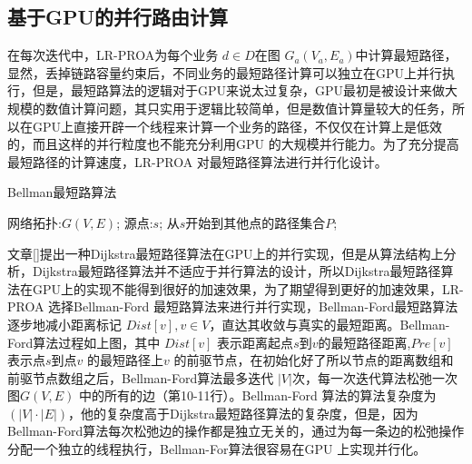 \subsection{基于GPU的并行路由计算}
  在每次迭代中，LR-PROA为每个业务 $d \in D$在图 $G_a(V_a, E_a)$中计算最短路径，显然，丢掉链路容量约束后，不同业务的最短路径计算可以独立在GPU上并行执行，但是，最短路算法的逻辑对于GPU来说太过复杂，GPU最初是被设计来做大规模的数值计算问题，其只实用于逻辑比较简单，但是数值计算量较大的任务，所以在GPU上直接开辟一个线程来计算一个业务的路径，不仅仅在计算上是低效的，而且这样的并行粒度也不能充分利用GPU 的大规模并行能力。为了充分提高最短路径的计算速度，LR-PROA 对最短路径算法进行并行化设计。
\begin{algorithm}[htb]
\caption{{Bellman最短路算法}}
\label{Bellman}
\begin{algorithmic}[1]
\Require
网络拓扑:$G(V, E)$;
源点:$s$;
\Ensure
从$s$开始到其他点的路径集合$P$;
\EndFor
{}
\EndIf
\EndFor
\EndWhile
{}
\end{algorithmic}
\end{algorithm}
  文章[]提出一种Dijkstra最短路径算法在GPU上的并行实现，但是从算法结构上分析，Dijkstra最短路径算法并不适应于并行算法的设计，所以Dijkstra最短路径算法在GPU上的实现不能得到很好的加速效果，为了期望得到更好的加速效果，LR-PROA 选择Bellman-Ford 最短路算法来进行并行实现，Bellman-Ford最短路算法逐步地减小距离标记 $Dist[v],v\in V$，直达其收敛与真实的最短距离。Bellman-Ford算法过程如上图，其中 $Dist[v]$ 表示距离起点$s$到$v$的最短路径距离,$Pre[v]$ 表示点$s$到点$v$ 的最短路径上$v$ 的前驱节点，在初始化好了所以节点的距离数组和前驱节点数组之后，Bellman-Ford算法最多迭代 $|V|$次，每一次迭代算法松弛一次图$G(V, E)$ 中的所有的边（第10-11行）。Bellman-Ford 算法的算法复杂度为$(|V|\cdot |E|)$，他的复杂度高于Dijkstra最短路径算法的复杂度，但是，因为Bellman-Ford算法每次松弛边的操作都是独立无关的，通过为每一条边的松弛操作分配一个独立的线程执行，Bellman-For算法很容易在GPU 上实现并行化。
